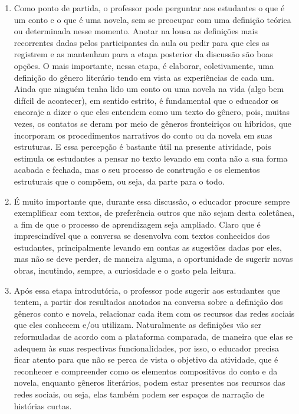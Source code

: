 \documentclass[12pt]{extarticle}
\begin{document}
\begin{enumerate}
\item
Como ponto de partida, o professor pode
perguntar aos estudantes o que é um conto e o que é uma novela, sem se
preocupar com uma definição teórica ou determinada nesse momento. Anotar
na lousa as definições mais recorrentes dadas pelos participantes da aula
ou pedir para que eles as registrem e as mantenham para a etapa posterior
da discussão são boas opções. O mais importante, nessa etapa, é
elaborar, coletivamente, uma definição do gênero literário tendo em
vista as experiências de cada um. Ainda que ninguém tenha lido um conto
ou uma novela na vida (algo bem difícil de acontecer), em sentido
estrito, é fundamental que o educador os encoraje a dizer o que eles
entendem como um texto do gênero, pois, muitas vezes, os contatos se
deram por meio de gêneros fronteiriços ou híbridos, que incorporam os
procedimentos narrativos do conto ou da novela em suas estruturas. E
essa percepção é bastante útil na presente atividade, pois estimula os
estudantes a pensar no texto levando em conta não a sua forma acabada e
fechada, mas o seu processo de construção e os elementos estruturais que
o compõem, ou seja, da parte para o todo.

\item
É muito importante que, durante essa discussão, o educador procure
sempre exemplificar com textos, de preferência outros que não sejam
desta coletânea, a fim de que o processo de aprendizagem seja ampliado.
Claro que é imprescindível que a conversa se desenvolva com textos
conhecidos dos estudantes, principalmente levando em contas as sugestões
dadas por eles, mas não se deve perder, de maneira alguma, a
oportunidade de sugerir novas obras, incutindo, sempre, a curiosidade e
o gosto pela leitura.

\item
Após essa etapa introdutória, o professor pode sugerir aos estudantes
que tentem, a partir dos resultados anotados na conversa sobre a
definição dos gêneros conto e novela, relacionar cada item com os
recursos das redes sociais que eles conhecem e/ou utilizam. Naturalmente
as definições vão ser reformuladas de acordo com a plataforma comparada,
de maneira que elas se adequem às suas respectivas funcionalidades, por
isso, o educador precisa ficar atento para que não se perca de vista o
objetivo da atividade, que é reconhecer e compreender como os elementos
compositivos do conto e da novela, enquanto gêneros literários, podem
estar presentes nos recursos das redes sociais, ou seja, elas também
podem ser espaços de narração de histórias curtas.


\end{enumerate}
\end{document}
